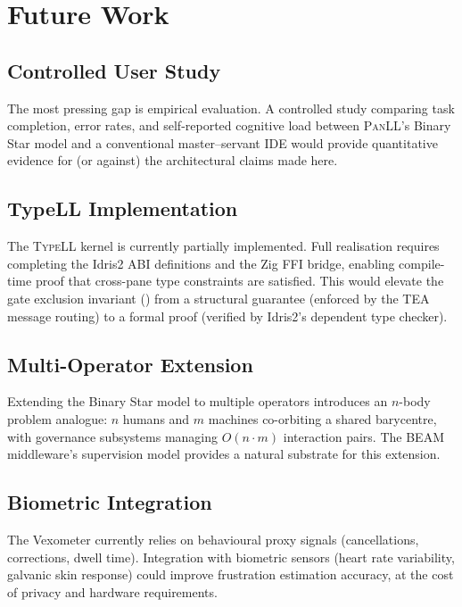 \documentclass[11pt,a4paper]{article}
\newcommand{\panll}{\textsc{PanLL}}
\newcommand{\typell}{\textsc{TypeLL}}
\newcommand{\tea}{\textsc{TEA}}
\begin{document}
\section{Future Work}\label{sec:future}

\subsection{Controlled User Study}

The most pressing gap is empirical evaluation. A controlled study
comparing task completion, error rates, and self-reported cognitive
load between \panll{}'s Binary Star model and a conventional
master--servant IDE would provide quantitative evidence for (or
against) the architectural claims made here.

\subsection{TypeLL Implementation}

The \typell{} kernel is currently partially implemented. Full
realisation requires completing the Idris2 ABI definitions and
the Zig FFI bridge, enabling compile-time proof that cross-pane
type constraints are satisfied. This would elevate the gate
exclusion invariant () from a structural guarantee
(enforced by the \tea{} message routing) to a formal proof
(verified by Idris2's dependent type checker).

\subsection{Multi-Operator Extension}

Extending the Binary Star model to multiple operators introduces
an $n$-body problem analogue: $n$ humans and $m$ machines co-orbiting
a shared barycentre, with governance subsystems managing $O(n \cdot m)$
interaction pairs. The BEAM middleware's supervision model provides
a natural substrate for this extension.

\subsection{Biometric Integration}

The Vexometer currently relies on behavioural proxy signals
(cancellations, corrections, dwell time). Integration with
biometric sensors (heart rate variability, galvanic skin response)
could improve frustration estimation accuracy, at the cost of
privacy and hardware requirements.
\end{document}
